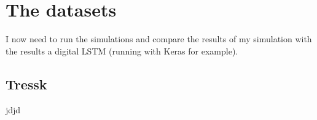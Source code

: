 \documentclass[table]{beamer}
\begin{document}
  \section{The datasets}
  \begin{frame}{\insertsection}{\insertsubsection}
    I now need to run the simulations and compare the results of my simulation with the results a digital LSTM (running with Keras for example).
  \end{frame}

  \subsection{Tressk}
  \begin{frame}{jdjd}{}
  \end{frame}

  
\end{document}

